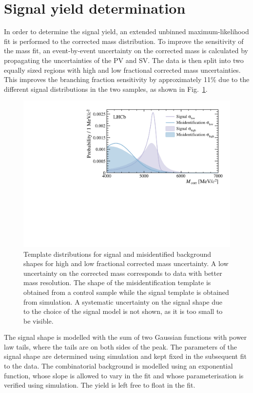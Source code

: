 \section{Signal yield determination}
\label{sec:results}
In order to determine the \Bmumumu signal yield, an extended unbinned maximum-likelihood
fit is performed to the corrected mass distribution. To improve the sensitivity of the mass fit, an event-by-event uncertainty on the corrected mass is calculated by propagating the uncertainties of the PV and SV. The data is then split into two equally sized regions with high and low fractional corrected mass uncertainties. This improves the branching fraction sensitivity by approximately 11\% due to the different signal distributions in the two samples, as shown in Fig.~\ref{fig:resofit}.
\begin{figure}[t]
\centering
	\includegraphics[width=0.85\linewidth]{Figure_3.pdf}
	\caption{\small Template distributions for signal and misidentified background
          shapes for high and low fractional corrected mass
          uncertainty. A low uncertainty on the
          corrected mass corresponds to data with better mass
          resolution. The shape of the misidentification template is
          obtained from a control sample while the signal template is
          obtained from simulation. A systematic uncertainty on the signal shape due to the choice of the signal model is not shown, as it is too small to be visible.}
\label{fig:resofit}
\end{figure}

The signal shape is modelled with the sum of two Gaussian functions with power law tails, where the tails are on both sides of the peak. The parameters of the signal shape are determined using simulation and kept fixed in the subsequent fit to the data. The combinatorial background is modelled using an exponential function, whose slope is allowed to vary in the fit and whose parameterisation is verified using simulation. The yield is left free to float in the fit.

